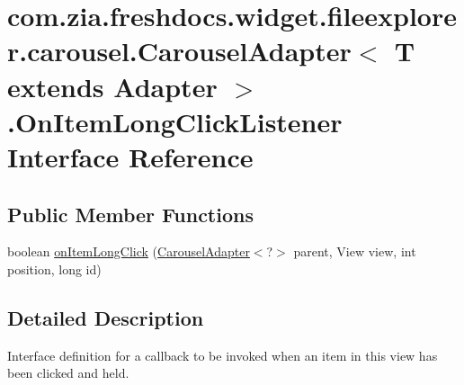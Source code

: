 \hypertarget{interfacecom_1_1zia_1_1freshdocs_1_1widget_1_1fileexplorer_1_1carousel_1_1_carousel_adapter_3_018fa25a89e81a066e4e36ba61d1427192}{\section{com.\-zia.\-freshdocs.\-widget.\-fileexplorer.\-carousel.\-Carousel\-Adapter$<$ T extends Adapter $>$.On\-Item\-Long\-Click\-Listener Interface Reference}
\label{interfacecom_1_1zia_1_1freshdocs_1_1widget_1_1fileexplorer_1_1carousel_1_1_carousel_adapter_3_018fa25a89e81a066e4e36ba61d1427192}
}
\subsection*{Public Member Functions}
\begin{DoxyCompactItemize}
\item 
boolean \hyperlink{interfacecom_1_1zia_1_1freshdocs_1_1widget_1_1fileexplorer_1_1carousel_1_1_carousel_adapter_3_018fa25a89e81a066e4e36ba61d1427192_aaf20fb4e5ba0a17ab67eb785955fd81a}{on\-Item\-Long\-Click} (\hyperlink{classcom_1_1zia_1_1freshdocs_1_1widget_1_1fileexplorer_1_1carousel_1_1_carousel_adapter_3_01_t_01extends_01_adapter_01_4_a83aef3f3a9694fbc32954c4872b85911}{Carousel\-Adapter}$<$?$>$ parent, View view, int position, long id)
\end{DoxyCompactItemize}


\subsection{Detailed Description}
Interface definition for a callback to be invoked when an item in this view has been clicked and held. 

